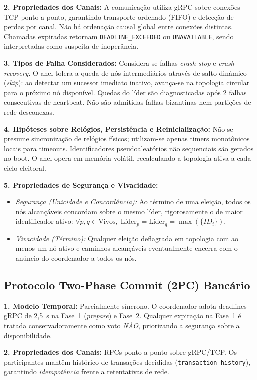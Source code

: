 \documentclass[conference]{IEEEtran}
\begin{document}
\textbf{2. Propriedades dos Canais:} A comunicação utiliza gRPC sobre conexões TCP ponto a ponto, garantindo transporte ordenado (FIFO) e detecção de perdas por canal. Não há ordenação causal global entre conexões distintas. Chamadas expiradas retornam \texttt{DEADLINE\_EXCEEDED} ou \texttt{UNAVAILABLE}, sendo interpretadas como suspeita de inoperância.

\textbf{3. Tipos de Falha Considerados:} Considera-se falhas \textit{crash-stop} e \textit{crash-recovery}. O anel tolera a queda de nós intermediários através de salto dinâmico (\textit{skip}): ao detectar um sucessor imediato inativo, avança-se na topologia circular para o próximo nó disponível. Quedas do líder são diagnosticadas após 2 falhas consecutivas de heartbeat. Não são admitidas falhas bizantinas nem partições de rede desconexas.

\textbf{4. Hipóteses sobre Relógios, Persistência e Reinicialização:} Não se presume sincronização de relógios físicos; utilizam-se apenas timers monotônicos locais para timeouts. Identificadores pseudoaleatórios não sequenciais são gerados no boot. O anel opera em memória volátil, recalculando a topologia ativa a cada ciclo eleitoral.

\textbf{5. Propriedades de Segurança e Vivacidade:}
\begin{itemize}
  \item \textit{Segurança (Unicidade e Concordância):} Ao término de uma eleição, todos os nós alcançáveis concordam sobre o mesmo líder, rigorosamente o de maior identificador ativo:
  $\forall p, q \in \text{Vivos}, \; \text{Líder}_p = \text{Líder}_q = \max(\{ID_i\})$.
  \item \textit{Vivacidade (Término):} Qualquer eleição deflagrada em topologia com ao menos um nó ativo e caminhos alcançáveis eventualmente encerra com o anúncio do coordenador a todos os nós.
\end{itemize}

\subsection{Protocolo Two-Phase Commit (2PC) Bancário}
\textbf{1. Modelo Temporal:} Parcialmente síncrono. O coordenador adota deadlines gRPC de 2,5~s na Fase~1 (\textit{prepare}) e Fase~2. Qualquer expiração na Fase~1 é tratada conservadoramente como voto \textit{NÃO}, priorizando a segurança sobre a disponibilidade.

\textbf{2. Propriedades dos Canais:} RPCs ponto a ponto sobre gRPC/TCP. Os participantes mantêm histórico de transações decididas (\texttt{transaction\_history}), garantindo \textit{idempotência} frente a retentativas de rede.
\end{document}
